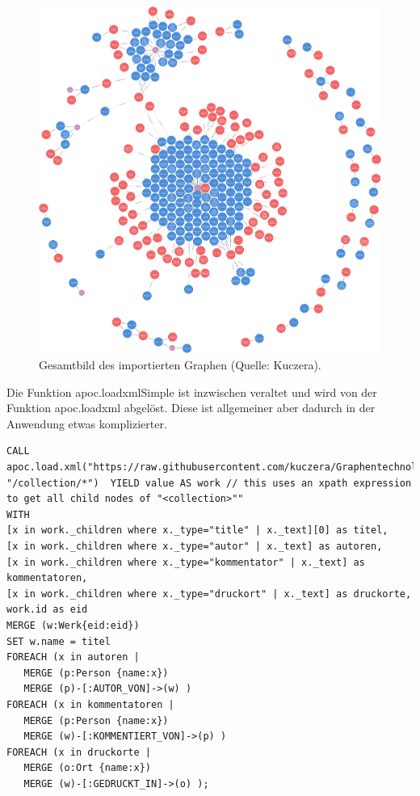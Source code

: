 \documentclass[ngerman,]{scrreprt}
\begin{document}
\begin{figure}
\centering
\includegraphics{Bilder/Kollatz-Druckernetzwerk.png}
\caption{Gesamtbild des importierten Graphen (Quelle: Kuczera).}
\end{figure}

Die Funktion apoc.loadxmlSimple ist inzwischen veraltet und wird von der Funktion apoc.loadxml abgelöst. Diese ist allgemeiner aber dadurch in der Anwendung etwas komplizierter.

\begin{verbatim}
CALL
apoc.load.xml("https://raw.githubusercontent.com/kuczera/Graphentechnologien/master/docs/data/kollatz.xml", "/collection/*")  YIELD value AS work // this uses an xpath expression to get all child nodes of "<collection>""
WITH
[x in work._children where x._type="title" | x._text][0] as titel,
[x in work._children where x._type="autor" | x._text] as autoren,
[x in work._children where x._type="kommentator" | x._text] as kommentatoren,
[x in work._children where x._type="druckort" | x._text] as druckorte,
work.id as eid
MERGE (w:Werk{eid:eid})
SET w.name = titel
FOREACH (x in autoren |
   MERGE (p:Person {name:x})
   MERGE (p)-[:AUTOR_VON]->(w) )
FOREACH (x in kommentatoren |
   MERGE (p:Person {name:x})
   MERGE (w)-[:KOMMENTIERT_VON]->(p) )
FOREACH (x in druckorte |
   MERGE (o:Ort {name:x})
   MERGE (w)-[:GEDRUCKT_IN]->(o) );
\end{verbatim}
\end{document}
